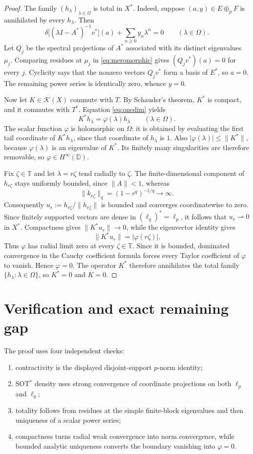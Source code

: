 \documentclass[11pt]{article}
\newcommand{\K}{\mathcal K}
\newcommand{\D}{\mathbb D}
\newcommand{\T}{\mathbb T}
\begin{document}
\begin{proof}
The family $(h_\lambda)_{\lambda\in\Omega}$ is total in $X^*$.  Indeed,
suppose $(a,y)\in E\oplus_pF$ is annihilated by every $h_\lambda$.  Then
\begin{equation}\label{eq:meromorphic}
 \delta\bigl[(\lambda I-A^*)^{-1}v^*\bigr](a)
 +\sum_{n\geq0}y_n\lambda^n=0
 \qquad(\lambda\in\Omega).
\end{equation}
Let $Q_j$ be the spectral projections of $A^*$ associated with its distinct
eigenvalues $\mu_j$.  Comparing residues at $\mu_j$ in
\eqref{eq:meromorphic} gives $(Q_jv^*)(a)=0$ for every $j$.  Cyclicity says
that the nonzero vectors $Q_jv^*$ form a basis of $E^*$, so $a=0$.  The
remaining power series is identically zero, whence $y=0$.

Now let $K\in\K(X)$ commute with $T$.  By Schauder's theorem, $K^*$ is
compact, and it commutes with $T^*$.  Equation \eqref{eq:onedim} yields
\[
 K^*h_\lambda=\varphi(\lambda)h_\lambda
 \qquad(\lambda\in\Omega).
\]
The scalar function $\varphi$ is holomorphic on $\Omega$: it is obtained by
evaluating the first tail coordinate of $K^*h_\lambda$, since that coordinate
of $h_\lambda$ is $1$.  Also
$|\varphi(\lambda)|\leq\|K^*\|$, because $\varphi(\lambda)$ is an eigenvalue
of $K^*$.  Its finitely many singularities are therefore removable, so
$\varphi\in H^\infty(\D)$.

Fix $\zeta\in\T$ and let $\lambda=r\zeta$ tend radially to $\zeta$.  The
finite-dimensional component of $h_{r\zeta}$ stays uniformly bounded, since
$\|A\|<1$, whereas
\[
 \|k_{r\zeta}\|_q=(1-r^q)^{-1/q}\longrightarrow\infty.
\]
Consequently $u_r:=h_{r\zeta}/\|h_{r\zeta}\|$ is bounded and converges
coordinatewise to zero.  Since finitely supported vectors are dense in
$(\ell_q)^*=\ell_p$, it follows that $u_r\rightharpoonup0$ in $X^*$.
Compactness gives $\|K^*u_r\|\to0$, while the eigenvector identity gives
\[
 \|K^*u_r\|=|\varphi(r\zeta)|.
\]
Thus $\varphi$ has radial limit zero at every $\zeta\in\T$.  Since it is
bounded, dominated convergence in the Cauchy coefficient formula forces
every Taylor coefficient of $\varphi$ to vanish.  Hence $\varphi=0$.
The operator $K^*$ therefore annihilates the total family
$\{h_\lambda:\lambda\in\Omega\}$, so $K^*=0$ and $K=0$.
\end{proof}

\section*{Verification and exact remaining gap}
The proof uses four independent checks:
\begin{enumerate}
\item contractivity is the displayed disjoint-support $p$-norm identity;
\item SOT$^*$ density uses strong convergence of coordinate projections on
both $\ell_p$ and $\ell_q$;
\item totality follows from residues at the simple finite-block eigenvalues
and then uniqueness of a scalar power series;
\item compactness turns radial weak convergence into norm convergence, while
bounded analytic uniqueness converts the boundary vanishing into
$\varphi=0$.
\end{enumerate}
\end{document}
